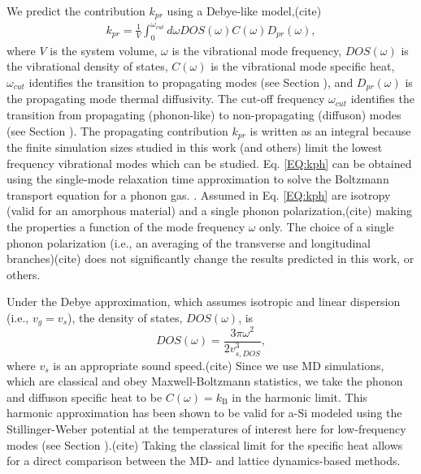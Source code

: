 \documentclass[aps,prb,onecolumn,preprint,superscriptaddress,footinbib,amsmath,amssymb,floatfix]{revtex4}
\begin{document}
We predict 
the contribution $k_{pr}$ using a Debye-like model,(cite) 
\begin{equation}\label{EQ:kph}
\begin{split}
k_{pr} = \frac{1}{V}\int_{0}^{\omega_{cut}} 
d\omega DOS(\omega) C(\omega) D_{pr}(\omega),
\end{split}
\end{equation}
where $V$ is the system volume, $\omega$ is the vibrational mode 
frequency, $DOS(\omega)$ is the vibrational 
density of states, $C(\omega)$ is the vibrational mode specific heat, 
$\omega_{cut}$ identifies the transition to propagating modes 
(see Section ), and 
$D_{pr}(\omega)$ is the propagating mode thermal diffusivity.
The cut-off frequency $\omega_{cut}$ identifies the transition from 
propagating (phonon-like) to non-propagating (diffuson) modes 
(see Section ).
\cite{feldman_thermal_1993,cahill_thermal_1994,
feldman_numerical_1999,liu_high_2009,yang_anomalously_2010}
The propagating contribution $k_{pr}$ is written as an integral because 
the finite simulation sizes studied in this work (and others)
\cite{feldman_thermal_1993,feldman_numerical_1999}
limit the lowest 
frequency vibrational modes which can be studied. 
Eq. \eqref{EQ:kph} can be obtained using the single-mode relaxation
time approximation to solve 
the Boltzmann transport equation for a phonon gas.
\cite{ziman_electrons_2001}. Assumed in Eq. \eqref{EQ:kph} 
are isotropy (valid for an amorphous material) and a single phonon 
polarization,(cite) making the  
properties a function of the mode frequency $\omega$ only. The 
choice of a single phonon polarization (i.e., an averaging 
of the transverse and longitudinal branches)(cite) does not 
significantly change 
the results predicted in this work, or others.
\cite{feldman_thermal_1993,cahill_thermal_1994,
feldman_numerical_1999,baldi_thermal_2008,liu_high_2009,
yang_anomalously_2010} 

Under the Debye approximation, 
which assumes isotropic and linear dispersion (i.e., $v_g = v_s$), 
the density of states, $DOS(\omega)$, is
\begin{equation}\label{EQ:DOS_debye}
DOS(\omega) = \frac{3\pi\omega^2}{2v_{s,DOS}^3},
\end{equation}
where $v_s$ is an appropriate sound speed.(cite) 
Since we use MD simulations, which are classical 
and obey Maxwell-Boltzmann 
statistics,\cite{mcquarrie_statistical_2000} we take the phonon and diffuson 
specific heat to be $C(\omega) = k_{\text{B}}$ in the 
harmonic limit. This harmonic approximation has been shown to be valid 
for a-Si modeled using the Stillinger-Weber potential at the temperatures of 
interest here for low-frequency modes (see Section ).(cite) 
Taking the classical limit for the specific heat allows for a direct 
comparison between 
the MD- and lattice dynamics-based methods. 
\end{document}
